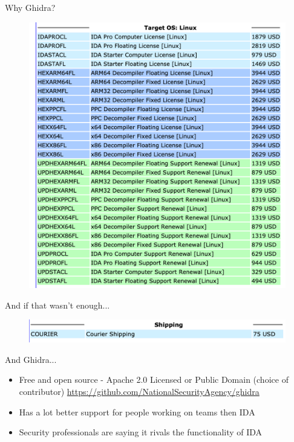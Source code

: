 \documentclass{beamer}
\begin{document}
\begin{frame}{Why Ghidra?}
  \begin{figure}
    \includegraphics[width=\textwidth]{hex-rays-pricing.png}
  \end{figure}
\end{frame}

\begin{frame}{And if that wasn't enough...}
  \begin{figure}
    \includegraphics[width=\textwidth]{ida-shipping.png}
  \end{figure}
\end{frame}

\begin{frame}{And Ghidra...}
  \begin{itemize}
    \item Free and open source - Apache 2.0 Licensed or Public Domain
      (choice of contributor)
      \url{https://github.com/NationalSecurityAgency/ghidra}
    \item Has a lot better support for people working on teams then
      IDA 
    \item Security professionals are saying it rivals the
      functionality of IDA
  \end{itemize}
\end{frame}
\end{document}

